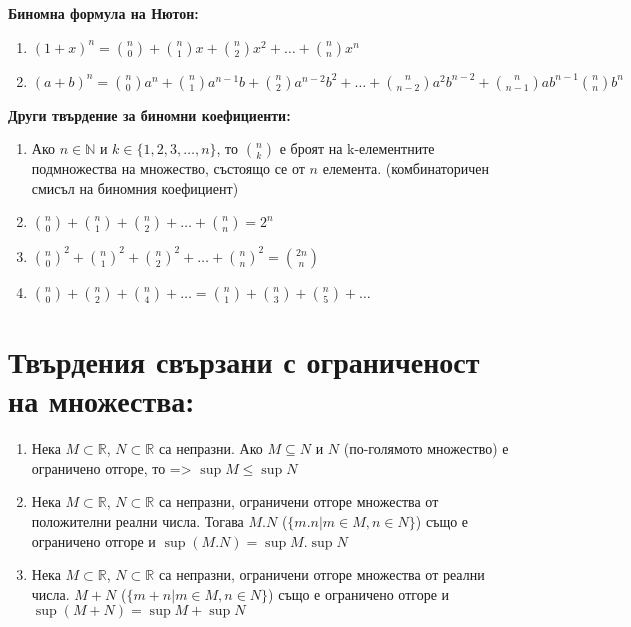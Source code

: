 \documentclass[11pt,oneside,a4paper]{article}
\begin{document}
\textbf{Биномна формула на Нютон: }\vspace{-\baselineskip}
\begin{enumerate}[label=\textbf{(\alph*)}]
    \item \((1 + x)^n = \binom{n}{0} + \binom{n}{1}x + \binom{n}{2}x^2 + \dots + \binom{n}{n}x^n\)
    \item \((a + b)^n = \binom{n}{0}a^n + \binom{n}{1}a^{n-1}b + \binom{n}{2}a^{n-2}b^2 + \dots + \binom{n}{n-2}a^2b^{n-2} + \binom{n}{n-1}ab^{n-1} \binom{n}{n}b^n \)
\end{enumerate}

\textbf{Други твърдение за биномни коефициенти: }\vspace{-\baselineskip}
\begin{enumerate}[label=\textbf{(\alph*)}]
    \item Ако \(n \in \mathbb{N}\) и \(k \in \{1, 2, 3, \dots, n\}\), то \(\binom{n}{k}\) е броят на k-елементните подмножества на множество, състоящо се от \(n\) елемента. (комбинаторичен смисъл на биномния коефициент)
    \item \(\binom{n}{0} + \binom{n}{1} + \binom{n}{2} + \dots + \binom{n}{n} = 2^n\)
    \item \(\binom{n}{0}^2 + \binom{n}{1}^2 + \binom{n}{2}^2 + \dots + \binom{n}{n}^2 = \binom{2n}{n}\)
    \item \(\binom{n}{0} + \binom{n}{2} + \binom{n}{4} + \dots = \binom{n}{1} + \binom{n}{3} + \binom{n}{5} + \dots \)
\end{enumerate}

\section*{Твърдения свързани с ограниченост на множества:}

\begin{enumerate}
    \item Нека \(M \subset \mathbb{R}\), \(N \subset \mathbb{R}\) са непразни. Ако \(M \subseteq N\) и \(N\) (по-голямото множество) е ограничено отгоре, то => \(\sup M \leq \sup N\)
    \item Нека \(M \subset \mathbb{R}\), \(N \subset \mathbb{R}\) са непразни, ограничени отгоре множества от положителни реални числа. Тогава \(M.N\) (\(\{m.n | m \in M, n \in N\}\)) също е ограничено отгоре и \(\sup (M.N) = \sup M . \sup N\)
    \item Нека \(M \subset \mathbb{R}\), \(N \subset \mathbb{R}\) са непразни, ограничени отгоре множества от реални числа. \(M + N\) (\(\{m + n | m \in M, n \in N\}\)) също е ограничено отгоре и \(\sup (M + N) = \sup M + \sup N\) 
\end{enumerate}
\end{document}
